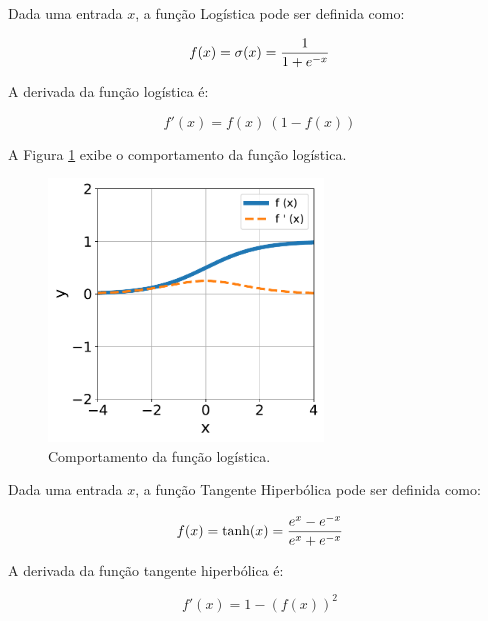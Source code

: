 \linebreak
\newpage


\begin{definition}
    Dada uma entrada $x$, a função Logística pode ser definida como:

    \begin{equation}
        f(x) = \sigma (x) = \dfrac{1}{1 + e^{-x}}
        \vspace{0.2cm}
        \label{eq:ann_logistic_function}
    \end{equation}

    A derivada da função logística é:

    \begin{equation}
        f'(x) = f(x)\ (1 - f(x))
        \label{eq:ann_logistic_function_dy}
    \end{equation}
    
\end{definition}

A Figura \ref{fig:ann_logistic_function} exibe o comportamento da função logística.

\begin{figure}[H]
    \centering
    \includegraphics[width=0.65\textwidth]{figs/ann_logistic_function.pdf}

    \caption{Comportamento da função logística.}
    \label{fig:ann_logistic_function}
\end{figure}


\linebreak
\newpage


\begin{definition}
    Dada uma entrada $x$, a função Tangente Hiperbólica pode ser definida como:

    \begin{equation}
        f(x) = \text{tanh}(x) = \dfrac{e^{x} - e^{-x}}{e^{x} + e^{-x}}
        \vspace{0.2cm}
        \label{eq:ann_tanh_function}
    \end{equation}

    A derivada da função tangente hiperbólica é:

    \begin{equation}
        f'(x) = 1 - (f(x))^{2}
        \label{eq:ann_tanh_function_dy}
    \end{equation}

\end{definition}

